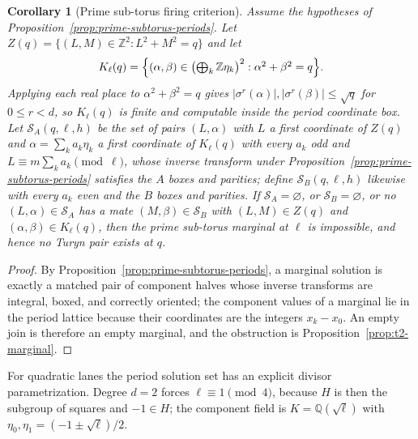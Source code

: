 \documentclass[11pt]{article}
\theoremstyle{plain}
\newtheorem{corollary}[theorem]{Corollary}
\theoremstyle{definition}
\theoremstyle{remark}
\newcommand{\Z}{\mathbb Z}
\newcommand{\Q}{\mathbb Q}
\begin{document}
\begin{corollary}[Prime sub-torus firing criterion]\label{cor:prime-subtorus-firing}
Assume the hypotheses of Proposition~\ref{prop:prime-subtorus-periods}.  Let
$Z(q)=\{(L,M)\in\Z^2:L^2+M^2=q\}$ and let
\[
  K_\ell(q)=\Bigl\{(\alpha,\beta)\in\bigl(\textstyle\bigoplus_k\Z\eta_k\bigr)^2:
  \alpha^2+\beta^2=q\Bigr\}.
\]
Applying each real place to $\alpha^2+\beta^2=q$ gives
$|\sigma^r(\alpha)|,|\sigma^r(\beta)|\le\sqrt q$ for $0\le r<d$, so
$K_\ell(q)$ is finite and computable inside the period coordinate box.  Let
$\mathcal S_A(q,\ell,h)$ be the set of pairs $(L,\alpha)$ with $L$ a first
coordinate of $Z(q)$ and $\alpha=\sum_ka_k\eta_k$ a first coordinate of
$K_\ell(q)$ with every $a_k$ odd and
$L\equiv m\sum_ka_k\pmod\ell$, whose inverse transform under
Proposition~\ref{prop:prime-subtorus-periods} satisfies the $A$ boxes and
parities; define $\mathcal S_B(q,\ell,h)$ likewise with every $a_k$ even and
the $B$ boxes and parities.  If $\mathcal S_A=\varnothing$, or
$\mathcal S_B=\varnothing$, or no $(L,\alpha)\in\mathcal S_A$ has a mate
$(M,\beta)\in\mathcal S_B$ with $(L,M)\in Z(q)$ and
$(\alpha,\beta)\in K_\ell(q)$, then the prime sub-torus marginal at $\ell$ is
impossible, and hence no Turyn pair exists at $q$.
\end{corollary}

\begin{proof}
By Proposition~\ref{prop:prime-subtorus-periods}, a marginal solution is
exactly a matched pair of component halves whose inverse transforms are
integral, boxed, and correctly oriented; the component values of a marginal
lie in the period lattice because their coordinates are the integers
$x_k-x_0$.  An empty join is therefore an empty marginal, and the obstruction
is Proposition~\ref{prop:t2-marginal}.
\end{proof}

For quadratic lanes the period solution set has an explicit divisor
parametrization.  Degree $d=2$ forces $\ell\equiv1\pmod4$, because $H$ is then
the subgroup of squares and $-1\in H$; the component field is
$K=\Q(\sqrt\ell)$ with $\eta_0,\eta_1=(-1\pm\sqrt\ell)/2$.
\end{document}

